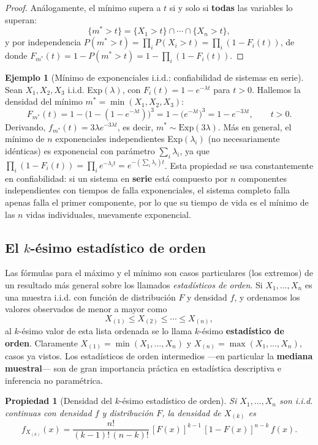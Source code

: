 \documentclass[11pt,a4paper]{article}
\theoremstyle{plain}
\newtheorem{propiedad}[teorema]{Propiedad}
\theoremstyle{definition}
\newtheorem{ejemplo}[teorema]{Ejemplo}
\theoremstyle{remark}
\begin{document}
\begin{proof}
Análogamente, el mínimo supera a $t$ si y solo si \textbf{todas} las variables lo superan:
\[
\{m^*>t\} = \{X_1>t\}\cap\cdots\cap\{X_n>t\},
\]
y por independencia $P(m^*>t) = \prod_i P(X_i>t) = \prod_i(1-F_i(t))$, de donde $F_{m^*}(t) = 1-P(m^*>t) = 1-\prod_i(1-F_i(t))$.
\end{proof}

\begin{ejemplo}[Mínimo de exponenciales i.i.d.: confiabilidad de sistemas en serie]\label{ej:minimo-exponenciales}
Sean $X_1,X_2,X_3$ i.i.d. Exp$(\lambda)$, con $F_i(t)=1-e^{-\lambda t}$ para $t>0$. Hallemos la densidad del mínimo $m^*=\min(X_1,X_2,X_3)$:
\[
F_{m^*}(t) = 1-\big(1-(1-e^{-\lambda t})\big)^3 = 1-\big(e^{-\lambda t}\big)^3 = 1-e^{-3\lambda t}, \qquad t>0.
\]
Derivando, $f_{m^*}(t)=3\lambda e^{-3\lambda t}$, es decir, $m^*\sim\text{Exp}(3\lambda)$. Más en general, el mínimo de $n$ exponenciales independientes Exp$(\lambda_i)$ (no necesariamente idénticas) es exponencial con parámetro $\sum_i\lambda_i$, ya que $\prod_i(1-F_i(t)) = \prod_i e^{-\lambda_i t} = e^{-(\sum_i\lambda_i)t}$. Esta propiedad se usa constantemente en confiabilidad: si un sistema en \textbf{serie} está compuesto por $n$ componentes independientes con tiempos de falla exponenciales, el sistema completo falla apenas falla el primer componente, por lo que su tiempo de vida es el mínimo de las $n$ vidas individuales, nuevamente exponencial.
\end{ejemplo}

\subsection{El $k$-ésimo estadístico de orden}

Las fórmulas para el máximo y el mínimo son casos particulares (los extremos) de un resultado más general sobre los llamados \emph{estadísticos de orden}. Si $X_1,\dots,X_n$ es una muestra i.i.d. con función de distribución $F$ y densidad $f$, y ordenamos los valores observados de menor a mayor como
\[
X_{(1)} \le X_{(2)} \le \cdots \le X_{(n)},
\]
al $k$-ésimo valor de esta lista ordenada se lo llama $k$-ésimo \textbf{estadístico de orden}. Claramente $X_{(1)}=\min(X_1,\dots,X_n)$ y $X_{(n)}=\max(X_1,\dots,X_n)$, casos ya vistos. Los estadísticos de orden intermedios —en particular la \textbf{mediana muestral}— son de gran importancia práctica en estadística descriptiva e inferencia no paramétrica.

\begin{propiedad}[Densidad del $k$-ésimo estadístico de orden]\label{prop:orden-k}
Si $X_1,\dots,X_n$ son i.i.d. continuas con densidad $f$ y distribución $F$, la densidad de $X_{(k)}$ es
\[
f_{X_{(k)}}(x) = \frac{n!}{(k-1)!\,(n-k)!}\, [F(x)]^{k-1}\,[1-F(x)]^{n-k}\, f(x).
\]
\end{propiedad}
\end{document}
